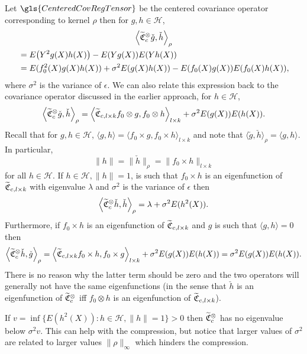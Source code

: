 \documentclass[AHL,Unicode,longabstracts,published]{cedram}
\theoremstyle{remark}
\newcommand{\cH}{\mathcal{H}}
\newcommand{\fkC}{\mathfrak{C}}
\let\oldtilde\tilde
\renewcommand*{\tilde}[1]{\mathchoice{\widetilde{#1}}{\widetilde{#1}}{\oldtilde{#1}}{\oldtilde{#1}}}
\let\originalleft\left
\let\originalright\right
\renewcommand{\left}{\mathopen{}\mathclose\bgroup\originalleft}
\renewcommand{\right}{\aftergroup\egroup\originalright}
\begin{document}
Let $\gls{CenteredCovRegTensor}$ be the centered covariance operator corresponding to kernel $\rho$ then for $g,h \in \cH$,
\begin{multline*}
\left\langle \tilde{\fkC}^\otimes_c \check g,\check h \right\rangle_\rho\\
\begin{aligned}
&= E\left(Y^2 g(X) h(X)\right) - E(Y g(X)) E(Y h(X))\\
&= E(f_0^2(X) g(X) h(X)) + \sigma^2 E(g(X) h(X)) - E(f_0(X) g(X)) E(f_0(X) h(X)),
\end{aligned}
\end{multline*}
where $\sigma^2$ is the variance of $\epsilon$. We can also relate this expression back to the covariance operator discussed in the earlier approach, for $h\in \cH$,
\[
\left\langle \tilde{\fkC}^\otimes_c \check g,\check h \right\rangle_\rho = \left\langle \tilde{\fkC}_{c,l\times k} f_0 \otimes g, f_0 \otimes h \right\rangle_{l\times k} + \sigma^2 E(g(X)) E(h(X)).
\]
Recall that for $g,h \in \cH$, $\langle g, h \rangle = \langle f_0 \times g, f_0 \times h \rangle_{l\times k}$ and note that $\langle \check g, \check h \rangle_\rho = \langle g,h \rangle$. In particular,
\begin{equation}\label{eq:norms_equiv}
\|h \| = \|\check h\|_\rho = \|f_0 \times h\|_{l \times k}
\end{equation}
for all $h\in \cH$. If $h\in \cH, \|h\|=1$, is such that $f_0 \times h$ is an eigenfunction of $\tilde{\fkC}_{c,l \times k}$ with eigenvalue $\lambda$ and $\sigma^2$ is the variance of $\epsilon$ then
\[
\left\langle \tilde{\fkC}^\otimes_c \check h,\check h \right\rangle_\rho = \lambda + \sigma^2 E(h^2(X)).
\]
Furthermore, if $f_0 \times h$ is an eigenfunction of $\tilde{\fkC}_{c,l \times k}$ and $g$ is such that $\langle g, h \rangle = 0$ then
\[
\left\langle \tilde{\fkC}^\otimes_c \check h,\check g \right\rangle_\rho = \left\langle \tilde{\fkC}_{c,l \times k} f_0 \times h, f_0 \times g \right\rangle_{l\times k} + \sigma^2 E(g(X)) E(h(X)) = \sigma^2 E(g(X)) E(h(X)).
\]
There is no reason why the latter term should be zero and the two operators will generally not have the same eigenfunctions (in the sense that $\check h$ is an eigenfunction of $\tilde{\fkC}^\otimes_c$ iff $f_0 \otimes h$ is an eigenfunction of $\tilde{\fkC}_{c,l \times k}$).

\begin{rema}\label{remark:lowest_EV_product}
If $v = \inf \{ E(h^2(X)) : h \in \cH, \|h \|=1\} > 0$ then $\tilde{\fkC}^\otimes_c$ has no eigenvalue below $\sigma^2 v$. This can help with the compression, but notice that larger values of $\sigma^2$ are related to larger values $\|\rho\|_\infty$ which hinders the compression.
\end{rema}
\end{document}
